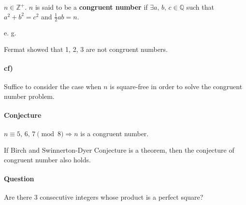 \begin{definition}
    $n \in \mathbb{Z}^+$. $n$ is said to be a \textbf{congruent number}
    if $\exists a,\,b,\,c \in \mathbb{Q}$ such that $a^2+b^2=c^2$ and $\frac{1}{2}ab=n$.
\end{definition}

e. g. 

\begin{center}
\end{center}

\begin{center}
\end{center}

Fermat showed that 1, 2, 3 are not congruent numbers.

\paragraph{cf)} Suffice to consider the case when $n$ is square-free
in order to solve the congruent number problem.

\paragraph{Conjecture} $n\equiv 5,\,6,\,7\pmod{8}\Rightarrow n$
is a congruent number.

\begin{remark}
    If Birch and Swinnerton-Dyer Conjecture is a theorem,
    then the conjecture of congruent number also holds.
\end{remark}

\paragraph{Question} Are there 3 consecutive integers whose product
is a perfect square?

